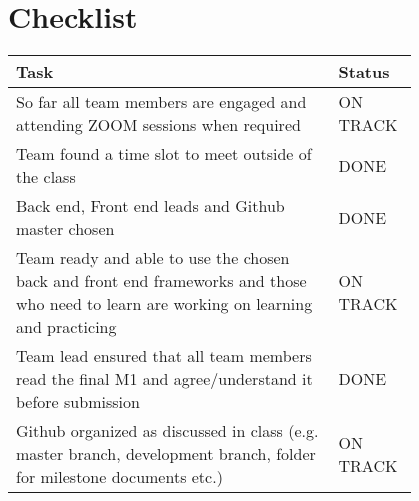 \section{Checklist}

\begin{tabular}{ | p{0.8\linewidth} | l | }
\hline
Task																																	& Status\\\hline
So far all team members are engaged and attending ZOOM sessions when required															& ON TRACK	\\\hline
Team found a time slot to meet outside of the class																						& DONE	\\\hline
Back end, Front end leads and Github master chosen																						& DONE	\\\hline
Team ready and able to use the chosen back and front end frameworks and those who need to learn are working on learning and practicing 	& ON TRACK	\\\hline
Team lead ensured that all team members read the final M1 and agree/understand it before submission										& DONE	\\\hline
Github organized as discussed in class (e.g. master branch, development branch, folder for milestone documents etc.)					& ON TRACK	\\\hline
\end{tabular}